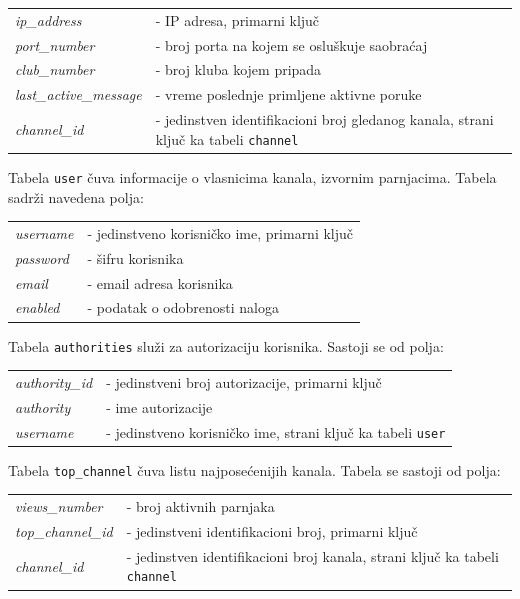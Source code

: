 \documentclass[12pt,oneside]{memoir}
\begin{document}
\begin{center}
\begin{tabular}{ p{3.8cm} p{10.2cm} }
 \textit{ip\_address} & - IP adresa, primarni ključ \\ 
 \textit{port\_number} & - broj porta na kojem se osluškuje saobraćaj \\  
 \textit{club\_number} & - broj kluba kojem pripada \\
 \textit{last\_active\_message} & - vreme poslednje primljene aktivne poruke \\
 \textit{channel\_id} & - jedinstven identifikacioni broj gledanog kanala, strani ključ ka tabeli \texttt{channel} \\
\end{tabular}
\end{center}


Tabela \texttt{user} čuva informacije o vlasnicima kanala, izvornim parnjacima. Tabela sadrži navedena polja:

\begin{center}
\begin{tabular}{ p{3.8cm} p{10.2cm} }
 \textit{username} & - jedinstveno korisničko ime, primarni ključ \\ 
 \textit{password} & - šifru korisnika \\  
 \textit{email} & - email adresa korisnika \\
 \textit{enabled} & - podatak o odobrenosti naloga \\
\end{tabular}
\end{center}

Tabela \texttt{authorities} služi za autorizaciju korisnika. Sastoji se od polja:

\begin{center}
\begin{tabular}{ p{3.8cm} p{10.2cm} }
 \textit{authority\_id} & - jedinstveni broj autorizacije, primarni ključ \\ 
 \textit{authority} & - ime autorizacije \\  
 \textit{username} & - jedinstveno korisničko ime, strani ključ ka tabeli \texttt{user} \\
\end{tabular}
\end{center}

Tabela \texttt{top\_channel} čuva listu najposećenijih kanala. Tabela se sastoji od polja:
 
\begin{center}
\begin{tabular}{ p{3.8cm} p{10.2cm} }
 \textit{views\_number} & - broj aktivnih parnjaka \\ 
 \textit{top\_channel\_id} & - jedinstveni identifikacioni broj, primarni ključ \\  
 \textit{channel\_id} & - jedinstven identifikacioni broj kanala, strani ključ ka tabeli \texttt{channel}  \\
\end{tabular}
\end{center}
\end{document}
